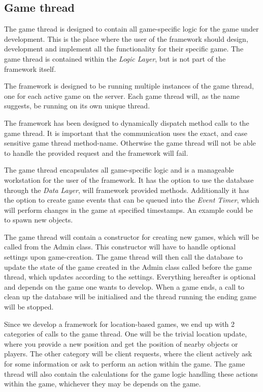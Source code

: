\subsection{Game thread}\label{designgamethread}
The game thread is designed to contain all game-specific logic for the game under development. This is the place where the user of the framework should design, development and implement all the functionality for their specific game. The game thread is contained within the \textit{Logic Layer}, but is not part of the framework itself. 

The framework is designed to be running multiple instances of the game thread, one for each active game on the server. Each game thread will, as the name suggests, be running on its own unique thread. 

The framework has been designed to dynamically dispatch method calls to the game thread. It is important that the communication uses the exact, and case sensitive game thread method-name. Otherwise the game thread will not be able to handle the provided request and the framework will fail. 

The game thread encapsulates all game-specific logic and is a manageable workstation for the user of the framework. It has the option to use the database through the \textit{Data Layer}, will framework provided methods. Additionally it has the option to create game events that can be queued into the \textit{Event Timer}, which will perform changes in the game at specified timestamps. An example could be to spawn new objects.

The game thread will contain a constructor for creating new games, which will be called from the Admin class. This constructor will have to handle optional settings upon game-creation. The game thread will then call the database to update the state of the game created in the Admin class called before the game thread, which updates according to the settings. Everything hereafter is optional and depends on the game one wants to develop. When a game ends, a call to clean up the database will be initialised and the thread running the ending game will be stopped.

Since we develop a framework for location-based games, we end up with 2 categories of calls to the game thread. One will be the trivial location update, where you provide a new position and get the position of nearby objects or players. The other category will be client requests, where the client actively ask for some information or ask to perform an action within the game. The game thread will also contain the calculations for the game logic handling these actions within the game, whichever they may be depends on the game. 